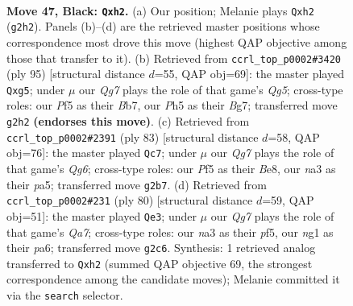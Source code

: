 \documentclass[11pt]{article}
\begin{document}
\clearpage

\begin{figure}[p]\centering
\begin{subfigure}{0.46\textwidth}\centering
\resizebox{\linewidth}{!}{%
\newchessgame
\chessboard[
  setfen={4n3/3b2k1/p7/4Pp1p/3P2p1/N7/4KPqP/Q5N1 b - - 1 47},
  showmover=false,
  pgfstyle=straightmove, color=movearrow, markmove={g2-h2}
]}
\caption{}
\end{subfigure}\hfill
\begin{subfigure}{0.46\textwidth}\centering
\resizebox{\linewidth}{!}{%
\newchessgame
\chessboard[
  setfen={6k1/1b4b1/8/p1p3P1/P2p1Nqp/1P6/3B2P1/5QK1 b - - 1 48},
  showmover=false,
  pgfstyle=straightmove, color=movearrow, markmove={g4-g5}
]}
\caption{}
\end{subfigure}
\\[4pt]
\begin{subfigure}{0.46\textwidth}\centering
\resizebox{\linewidth}{!}{%
\newchessgame
\chessboard[
  setfen={4bn2/1p4pk/p7/P2Q3p/4P2P/2P2Nq1/6B1/6K1 b - - 6 42},
  showmover=false,
  pgfstyle=straightmove, color=movearrow, markmove={g3-c7}
]}
\caption{}
\end{subfigure}\hfill
\begin{subfigure}{0.46\textwidth}\centering
\resizebox{\linewidth}{!}{%
\newchessgame
\chessboard[
  setfen={6n1/Qpq4k/p4p2/3p1p1P/5P2/1P3N1P/P4K2/8 w - - 4 41},
  showmover=false,
  pgfstyle=straightmove, color=movearrow, markmove={a7-e3}
]}
\caption{}
\end{subfigure}
\caption{\textbf{Move 47, Black: \texttt{Qxh2}.} (a) Our position; Melanie plays \texttt{Qxh2} (\texttt{g2h2}). Panels (b)--(d) are the retrieved master positions whose correspondence most drove this move (highest QAP objective among those that transfer to it). (b) Retrieved from \texttt{ccrl\_top\_p0002\#3420} (ply 95) [structural distance $d$=55, QAP obj=69]: the master played \texttt{Qxg5}; under $\mu$ our \emph{Qg7} plays the role of that game's \emph{Qg5}; cross-type roles: our \emph{P}f5 as their \emph{B}b7, our \emph{P}h5 as their \emph{B}g7; transferred move \texttt{g2h2} \textbf{(endorses this move)}. (c) Retrieved from \texttt{ccrl\_top\_p0002\#2391} (ply 83) [structural distance $d$=58, QAP obj=76]: the master played \texttt{Qc7}; under $\mu$ our \emph{Qg7} plays the role of that game's \emph{Qg6}; cross-type roles: our \emph{P}f5 as their \emph{B}e8, our \emph{n}a3 as their \emph{p}a5; transferred move \texttt{g2b7}. (d) Retrieved from \texttt{ccrl\_top\_p0002\#231} (ply 80) [structural distance $d$=59, QAP obj=51]: the master played \texttt{Qe3}; under $\mu$ our \emph{Qg7} plays the role of that game's \emph{Qa7}; cross-type roles: our \emph{n}a3 as their \emph{p}f5, our \emph{n}g1 as their \emph{p}a6; transferred move \texttt{g2c6}. Synthesis: 1 retrieved analog transferred to \texttt{Qxh2} (summed QAP objective 69, the strongest correspondence among the candidate moves); Melanie committed it via the \texttt{search} selector.}
\label{fig:thought-m93}
\end{figure}
\end{document}
